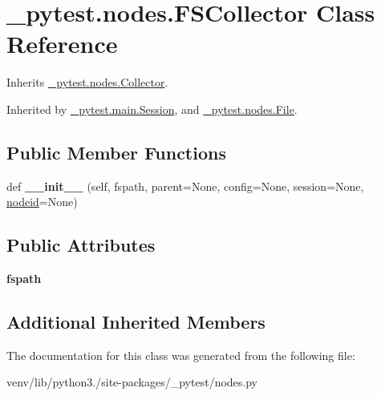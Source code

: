 \hypertarget{class__pytest_1_1nodes_1_1_f_s_collector}{}\section{\+\_\+pytest.\+nodes.\+F\+S\+Collector Class Reference}
\label{class__pytest_1_1nodes_1_1_f_s_collector}


Inherits \hyperlink{class__pytest_1_1nodes_1_1_collector}{\+\_\+pytest.\+nodes.\+Collector}.



Inherited by \hyperlink{class__pytest_1_1main_1_1_session}{\+\_\+pytest.\+main.\+Session}, and \hyperlink{class__pytest_1_1nodes_1_1_file}{\+\_\+pytest.\+nodes.\+File}.

\subsection*{Public Member Functions}
\begin{DoxyCompactItemize}
\item 
\mbox{\label{class__pytest_1_1nodes_1_1_f_s_collector_a1a5b89c960b834889722b5354645d159}} 
def {\bfseries \+\_\+\+\_\+init\+\_\+\+\_\+} (self, fspath, parent=None, config=None, session=None, \hyperlink{class__pytest_1_1nodes_1_1_node_a02f18acbfaf1f9d8ba9b6c1346dc6217}{nodeid}=None)
\end{DoxyCompactItemize}
\subsection*{Public Attributes}
\begin{DoxyCompactItemize}
\item 
\mbox{\label{class__pytest_1_1nodes_1_1_f_s_collector_ab18b4b2ce5929f990b20f8980a656e82}} 
{\bfseries fspath}
\end{DoxyCompactItemize}
\subsection*{Additional Inherited Members}


The documentation for this class was generated from the following file\+:\begin{DoxyCompactItemize}
\item 
venv/lib/python3./site-\/packages/\+\_\+pytest/nodes.\+py\end{DoxyCompactItemize}
